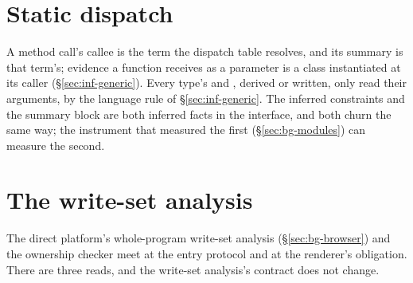 \section{Static dispatch}
\label{sec:compiler-dispatch}

A method call's callee is the term the dispatch table resolves, and its summary is that term's;
evidence a function receives as a parameter is a class instantiated at its caller
(\S\ref{sec:inf-generic}). Every type's  and , derived or written, only read
their arguments, by the language rule of \S\ref{sec:inf-generic}. The
inferred  constraints and the summary block are both inferred facts in the interface, and
both churn the same way; the instrument that measured the first (\S\ref{sec:bg-modules}) can measure
the second.

\section{The write-set analysis}
\label{sec:compiler-writesets}

The direct platform's whole-program write-set analysis (\S\ref{sec:bg-browser}) and the ownership
checker meet at the entry protocol and at the renderer's obligation. There are three reads, and the
write-set analysis's contract does not change.

